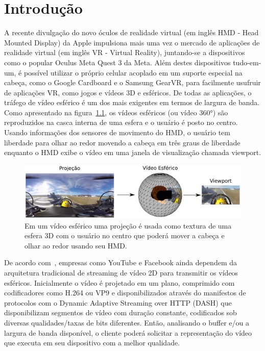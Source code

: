 \chapter{Introdução}\label{Cap:Introduction}


A recente divulgação do novo óculos de realidade virtual (em inglês HMD - Head Mounted Display) da Apple impulsiona mais uma vez o mercado de aplicações de realidade virtual (em inglês VR - Virtual Reality), juntando-se a dispositivos como o popular Oculus Meta Quest 3 da Meta. Além destes dispositivos tudo-em-um, é possível utilizar o próprio celular acoplado em um suporte especial na cabeça, como o Google Cardboard e o Samsung GearVR, para facilmente usufruir de aplicações VR, como jogos e vídeos 3D e esféricos. De todas as aplicações, o tráfego de vídeo esférico é um dos mais exigentes em termos de largura de banda. Como apresentado na figura~\ref{fig:viewport2}, os vídeos esféricos (ou vídeo 360°) são reproduzidos na casca interna de uma esfera e o usuário é posto no centro. Usando informações dos sensores de movimento do HMD, o usuário tem liberdade para olhar ao redor movendo a cabeça em três graus de liberdade enquanto o HMD exibe o vídeo em uma janela de visualização chamada viewport. 

\begin{figure}[htb]
	\centering
	\includegraphics[width=0.8\columnwidth]{fig/viewport.pdf}
	\caption{Em um vídeo esférico uma projeção é usada como textura de uma esfera 3D com o usuário no centro que poderá mover a cabeça e olhar ao redor usando seu HMD.}
	\label{fig:viewport2}
\end{figure}

De acordo com~\cite{Zhou2017, Liu2017}, empresas como YouTube e Facebook ainda dependem da arquitetura tradicional de streaming de vídeo 2D para transmitir os vídeos esféricos. Inicialmente o vídeo é projetado em um plano, comprimido com codificadores como H.264 ou VP9 e disponibilizados através do manifestos de protocolos com o Dynamic Adaptive Streaming over HTTP (DASH) que disponibilizam segmentos de vídeo com duração constante, codificados sob diversas qualidades/taxas de bits diferentes. Então, analisando o buffer e/ou a largura de banda disponível, o cliente poderá solicitar a representação do vídeo que executa em seu dispositivo com a melhor qualidade. 

